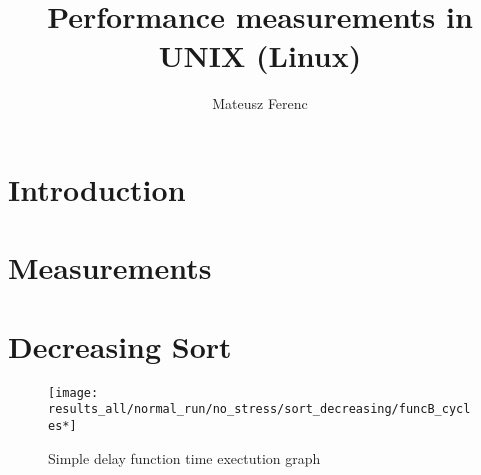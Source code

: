 \documentclass[11pt,twocolumn]{article}
\title{Performance measurements in UNIX (Linux)}
\author{Mateusz Ferenc}
\date{}
\begin{document}
	
\maketitle
	
\section*{Introduction}

\section*{Measurements}

\section{Decreasing Sort}

\begin{figure}[ht!]
	\texttt{[image: results\_all/normal\_run/no\_stress/sort\_decreasing/funcB\_cycles*]}
	\caption{Simple delay function time exectution graph}
\end{figure}
\end{document}
